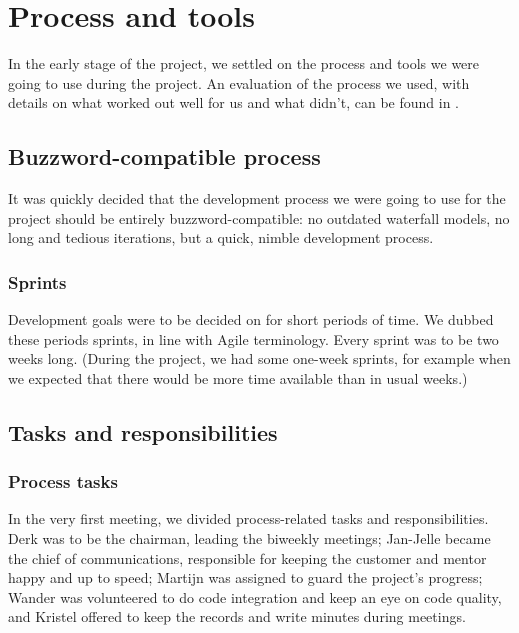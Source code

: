 \chapter{Process and tools}

In the early stage of the project, we settled on the process and tools we were going to use during the project. An evaluation of the process we used, with details on what worked out well for us and what didn't, can be found in . 

\section{Buzzword-compatible process}

It was quickly decided that the development process we were going to use for the project should be entirely buzzword-compatible: no outdated waterfall models, no long and tedious iterations, but a quick, nimble development process. 

\subsection{Sprints}

Development goals were to be decided on for short periods of time. We dubbed these periods sprints, in line with Agile terminology. Every sprint was to be two weeks long. (During the project, we had some one-week sprints, for example when we expected that there would be more time available than in usual weeks.) 

\section{Tasks and responsibilities}

\subsection{Process tasks}

In the very first meeting, we divided process-related tasks and responsibilities. Derk was to be the chairman, leading the biweekly meetings; Jan-Jelle became the chief of communications, responsible for keeping the customer and mentor happy and up to speed; Martijn was assigned to guard the project's progress; Wander was volunteered to do code integration and keep an eye on code quality, and Kristel offered to keep the records and write minutes during meetings. 

